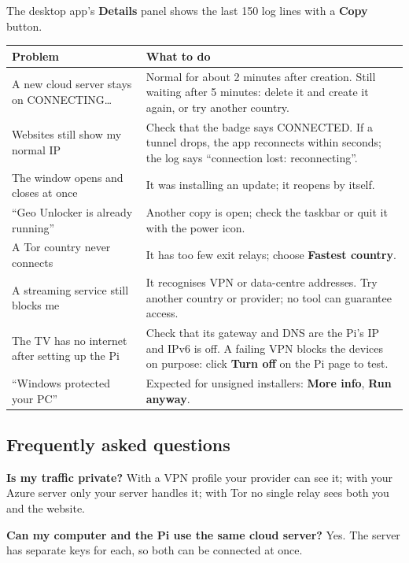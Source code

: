 \documentclass[11pt,a4paper]{article}
\newcommand{\ui}[1]{\textbf{#1}}            %
\begin{document}
The desktop app's \ui{Details} panel shows the last 150 log lines with a \ui{Copy} button.

\begin{center}
\begin{tabularx}{\linewidth}{@{}>{\raggedright\arraybackslash}p{5cm} L@{}}
\toprule
\textbf{Problem} & \textbf{What to do} \\
\midrule
A new cloud server stays on CONNECTING\ldots & Normal for about 2 minutes after creation. Still waiting after 5 minutes: delete it and create it again, or try another country. \\
Websites still show my normal IP & Check that the badge says CONNECTED. If a tunnel drops, the app reconnects within seconds; the log says ``connection lost: reconnecting''. \\
The window opens and closes at once & It was installing an update; it reopens by itself. \\
``Geo Unlocker is already running'' & Another copy is open; check the taskbar or quit it with the power icon. \\
A Tor country never connects & It has too few exit relays; choose \ui{Fastest country}. \\
A streaming service still blocks me & It recognises VPN or data-centre addresses. Try another country or provider; no tool can guarantee access. \\
The TV has no internet after setting up the Pi & Check that its gateway and DNS are the Pi's IP and IPv6 is off. A failing VPN blocks the devices on purpose: click \ui{Turn off} on the Pi page to test. \\
``Windows protected your PC'' & Expected for unsigned installers: \ui{More info}, \ui{Run anyway}. \\
\bottomrule
\end{tabularx}
\end{center}

\subsection*{Frequently asked questions}

\textbf{Is my traffic private?} With a VPN profile your provider can see it; with your Azure server only your server handles it; with Tor no single relay sees both you and the website.

\textbf{Can my computer and the Pi use the same cloud server?} Yes. The server has separate keys for each, so both can be connected at once.
\end{document}
